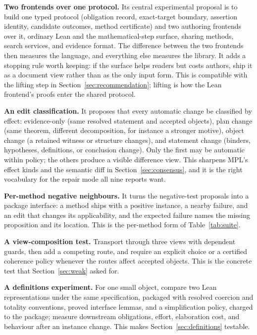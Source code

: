 \documentclass[11pt,a4paper]{article}
\newcommand{\ML}{\textsc{MPL}}
\theoremstyle{definition}
\begin{document}
\textbf{Two frontends over one protocol.} Its central experimental proposal is to build one typed protocol (obligation record, exact-target boundary, assertion identity, candidate outcomes, method certificate) and two authoring frontends over it, ordinary Lean and the mathematical-step surface, sharing methods, search services, and evidence format. The difference between the two frontends then measures the language, and everything else measures the library. It adds a stopping rule worth keeping: if the surface helps readers but costs authors, ship it as a document view rather than as the only input form. This is compatible with the lifting step in Section~\ref{sec:recommendation}; lifting is how the Lean frontend's proofs enter the shared protocol.

\textbf{An edit classification.} It proposes that every automatic change be classified by effect: evidence-only (same resolved statement and accepted objects), plan change (same theorem, different decomposition, for instance a stronger motive), object change (a retained witness or structure changes), and statement change (binders, hypotheses, definitions, or conclusion change). Only the first may be automatic within policy; the others produce a visible difference view. This sharpens \ML's effect kinds and the semantic diff in Section~\ref{sec:consensus}, and it is the right vocabulary for the repair mode all nine reports want.

\textbf{Per-method negative neighbours.} It turns the negative-test proposals into a package interface: a method ships with a positive instance, a nearby failure, and an edit that changes its applicability, and the expected failure names the missing proposition and its location. This is the per-method form of Table~\ref{tab:suite}.

\textbf{A view-composition test.} Transport through three views with dependent guards, then add a competing route, and require an explicit choice or a certified coherence policy whenever the routes affect accepted objects. This is the concrete test that Section~\ref{sec:weak} asked for.

\textbf{A definitions experiment.} For one small object, compare two Lean representations under the same specification, packaged with resolved coercion and totality conventions, proved interface lemmas, and a simplification policy, charged to the package; measure downstream obligations, effort, elaboration cost, and behaviour after an instance change. This makes Section~\ref{sec:definitions} testable.
\end{document}
